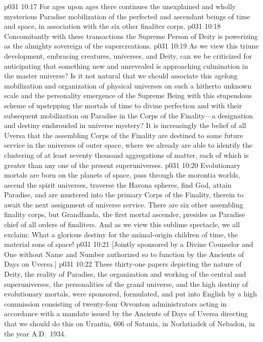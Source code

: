 \pc \vs p031 10:17 \bibnobreakspace For ages upon ages there continues the unexplained and wholly mysterious Paradise mobilization of the perfected and ascendant beings of time and space, in association with the six other finaliter corps.
\pc \vs p031 10:18 \bibnobreakspace Concomitantly with these transactions the Supreme Person of Deity is powerizing as the almighty sovereign of the supercreations.
\pc \vs p031 10:19 As we view this triune development, embracing creatures, universes, and Deity, can we be criticized for anticipating that something new and unrevealed is approaching culmination in the master universe? Is it not natural that we should associate this agelong mobilization and organization of physical universes on such a hitherto unknown scale and the personality emergence of the Supreme Being with this stupendous scheme of upstepping the mortals of time to divine perfection and with their subsequent mobilization on Paradise in the Corps of the Finality---a designation and destiny enshrouded in universe mystery? It is increasingly the belief of all Uversa that the assembling Corps of the Finality are destined to some future service in the universes of outer space, where we already are able to identify the clustering of at least seventy thousand aggregations of matter, each of which is greater than any one of the present superuniverses.
\pc \vs p031 10:20 Evolutionary mortals are born on the planets of space, pass through the morontia worlds, ascend the spirit universes, traverse the Havona spheres, find God, attain Paradise, and are mustered into the primary Corps of the Finality, therein to await the next assignment of universe service. There are six other assembling finality corps, but Grandfanda, the first mortal ascender, presides as Paradise chief of all orders of finaliters. And as we view this sublime spectacle, we all exclaim: What a glorious destiny for the animal\hyp{}origin children of time, the material sons of space!\plusone
\vsetoff
\pc \vs p031 10:21 [Jointly sponsored by a Divine Counselor and One without Name and Number authorized so to function by the Ancients of Days on Uversa.]
\separatorline
\vs p031 10:22 These thirty\hyp{}one papers depicting the nature of Deity, the reality of Paradise, the organization and working of the central and superuniverses, the personalities of the grand universe, and the high destiny of evolutionary mortals, were sponsored, formulated, and put into English by a high commission consisting of twenty\hyp{}four Orvonton administrators acting in accordance with a mandate issued by the Ancients of Days of Uversa directing that we should do this on Urantia, 606 of Satania, in Norlatiadek of Nebadon, in the year A.D.~1934.
